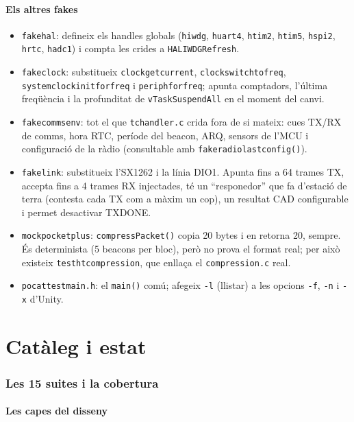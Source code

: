 \documentclass[11pt,a4paper]{article}
\DeclareRobustCommand{\_}{\textunderscore\allowbreak}
\newcommand{\cd}[1]{\texttt{#1}}
\begin{document}
\subsection{Els altres fakes}
\begin{itemize}
\item \cd{fake\_hal}: defineix els handles globals (\cd{hiwdg}, \cd{huart4}, \cd{htim2}, \cd{htim5},
  \cd{hspi2}, \cd{hrtc}, \cd{hadc1}) i compta les crides a \cd{HAL\_IWDG\_Refresh}.
\item \cd{fake\_clock}: substitueix \cd{clock\_get\_current}, \cd{clock\_switch\_to\_freq},
  \cd{systemclock\_init\_for\_freq} i \cd{periph\_*\_for\_freq}; apunta comptadors, l'última
  freqüència i la profunditat de \cd{vTaskSuspendAll} en el moment del canvi.
\item \cd{fake\_comms\_env}: tot el que \cd{tc\_handler.c} crida fora de si mateix: cues TX/RX de
  comms, hora RTC, període del beacon, ARQ, sensors de l'MCU i configuració de la ràdio
  (consultable amb \cd{fake\_radio\_last\_config()}).
\item \cd{fake\_link}: substitueix l'SX1262 i la línia DIO1. Apunta fins a 64 trames TX, accepta fins
  a 4 trames RX injectades, té un ``responedor'' que fa d'estació de terra (contesta cada TX com a
  màxim un cop), un resultat CAD configurable i permet desactivar TX\_DONE.
\item \cd{mock\_pocket\_plus}: \cd{compressPacket()} copia 20 bytes i en retorna 20, sempre. És
  determinista (5 beacons per bloc), però no prova el format real; per això existeix
  \cd{test\_ht\_compression}, que enllaça el \cd{compression.c} real.
\item \cd{pocat\_test\_main.h}: el \cd{main()} comú; afegeix \cd{-l} (llistar) a les opcions
  \cd{-f}, \cd{-n} i \cd{-x} d'Unity.
\end{itemize}
\part{Catàleg i estat}

\section{Les 15 suites i la cobertura}\label{sec:suites}

\subsection{Les capes del disseny}
\end{document}
